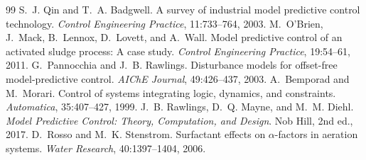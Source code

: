 \documentclass[11pt,a4paper]{article}
\begin{document}
\begin{thebibliography}{99}
 S.~J. Qin and T.~A. Badgwell. A survey of industrial model predictive control technology. \textit{Control Engineering Practice}, 11:733--764, 2003.
 M.~O'Brien, J.~Mack, B.~Lennox, D.~Lovett, and A.~Wall. Model predictive control of an activated sludge process: A case study. \textit{Control Engineering Practice}, 19:54--61, 2011.
 G.~Pannocchia and J.~B. Rawlings. Disturbance models for offset-free model-predictive control. \textit{AIChE Journal}, 49:426--437, 2003.
 A.~Bemporad and M.~Morari. Control of systems integrating logic, dynamics, and constraints. \textit{Automatica}, 35:407--427, 1999.
 J.~B. Rawlings, D.~Q. Mayne, and M.~M. Diehl. \textit{Model Predictive Control: Theory, Computation, and Design}. Nob Hill, 2nd ed., 2017.
 D.~Rosso and M.~K. Stenstrom. Surfactant effects on \(\alpha\)-factors in aeration systems. \textit{Water Research}, 40:1397--1404, 2006.
\end{thebibliography}
\end{document}
